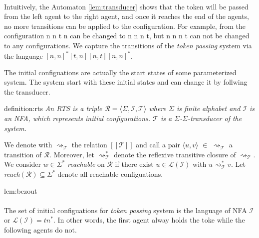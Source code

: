 \paragraph*{}
Intuitively, the Automaton \ref{lem:transducer} shows that the token will be passed from the left agent to the right agent, and once it 
reaches the end of the agents, no more transitions can be applied to the 
configuration. For example, from the configuration n n t n can be changed to n n n t,
but n n n t can not be changed to any configurations.
We capture the transitions of the \textit{token passing} system via the language 
$[n,n]^*[t,n][n,t][n,n]^*$.

The initial configuations are actually the start states of some parameterized system.
The system start with these initial states and can change it by follwing the transducer.
\begin{theo}{definition:rts}
    \textit{
    An RTS is a triple $\mathcal{R} = \langle \Sigma, \mathcal{I}, \mathcal{T} \rangle$ where $\Sigma$
    is finite alphabet and $\mathcal{I}$ is an NFA, which represents initial configurations.
    $\mathcal{T}$ is a $\Sigma$-$\Sigma$-\textit{transducer} of the system.
    }
\end{theo}

We denote with $\rightsquigarrow_\mathcal{T}$ the relation $[[\mathcal{T}]]$ and call
a pair $\langle u, v \rangle$ $\in$ $\rightsquigarrow_\mathcal{T}$ a transition of $\mathcal{R}$.
Moreover, let $\rightsquigarrow_\mathcal{T}^{*}$ denote the reflexive
transitive closure of $\rightsquigarrow_\mathcal{T}$.
We consider $w \in \Sigma^*$ \textit{reachable} on $\mathcal{R}$
if there exist $u \in \mathcal{L}(\mathcal{I})$ with $u \rightsquigarrow_\mathcal{T}^{*} v$.
Let \textit{reach}$(\mathcal{R}) \subseteq \Sigma^*$ denote all
reachable configuations.
\begin{lem}{lem:bezout}
\end{lem}

\paragraph*{}
The set of initial configuations for \textit{token passing} system is the language of NFA $\mathcal{I}$ or $\mathcal{L}(\mathcal{I})=tn^*$.
In other words, the first agent  alway holds the toke while the following agents do not.

